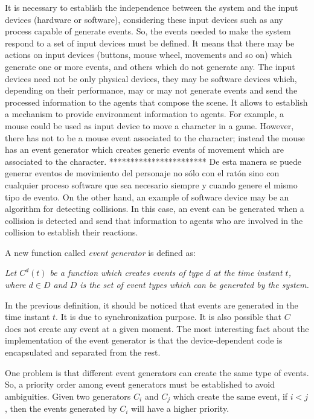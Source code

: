 \documentclass[runningheads]{llncs}
\begin{document}
It is necessary to establish the independence between the system and the input devices (hardware or software), 
considering these input devices such as any process capable of generate events. So, the events needed to make 
the system respond to a set of input devices must be defined. It means that
there may be actions on input devices (buttons, mouse wheel, movements and so on) which generate
one or more events, and others which do not generate any. The input devices need not be only 
physical devices, they may be software devices which, depending on their performance, may or may not
generate events and send the processed information to the agents that compose the scene. 	
It allows to establish a mechanism to provide environment information to agents.
For example, a mouse could be used as input device to move a character in a game. However, there has 
not to be a mouse event associated to the character; instead the mouse has an event generator which
creates generic events of movement which are associated to the character.
*********************** De esta manera se puede generar eventos de movimiento del personaje no sólo con el ratón sino con cualquier proceso software que sea necesario siempre y cuando genere el mismo tipo de evento.
On the other hand, an example of software device may be an algorithm
for detecting collisions. In this case, an event can be generated when a collision is detected 	
and send that information to agents who are involved in the collision to establish their reactions.	
	
A new function called \textit{event generator} is defined as:

{\itshape 
Let $C^d(t)$ be a function which creates events of type $d$ at the time instant $t$,
where $d \in D$ and $D$ is the set of event types which can be generated by the system. }	
	

In the previous definition, it should be noticed that events are generated in the time instant $t$.
It is due to synchronization purpose. It is also possible that $C$ does not create any event at a
given moment. The most interesting fact about the implementation of the event generator
is that the device-dependent code is encapsulated and separated from the rest.

One problem is that different event generators can create the same type of events. So, a priority
order among event generators must be established to avoid ambiguities. Given two generators $C_i$
and $C_j$ which create the same event, if $i < j$, then the events generated by $C_i$ will have a
higher priority.
\end{document}
